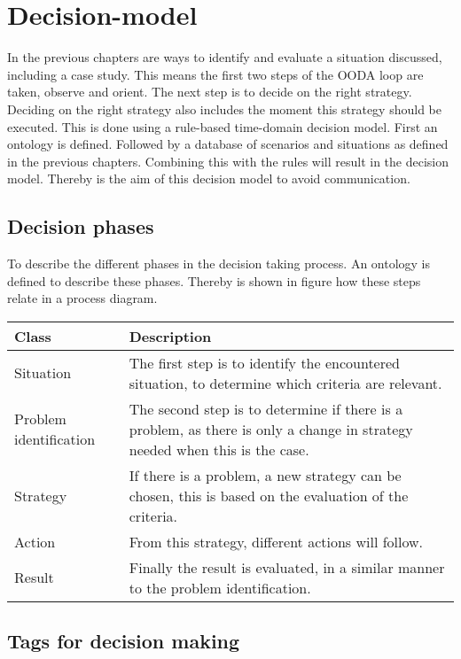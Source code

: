 \chapter{Decision-model}
In the previous chapters are ways to identify and evaluate a situation discussed, including a case study. This means the first two steps of the OODA loop are taken, observe and orient. The next step is to decide on the right strategy. Deciding on the right strategy also includes the moment this strategy should be executed. 
This is done using a rule-based time-domain decision model. First an ontology is defined. Followed by a database of scenarios and situations as defined in the previous chapters. Combining this with the rules will result in the decision model. Thereby is the aim of this decision model to avoid communication.

\section{Decision phases}
To describe the different phases in the decision taking process. An ontology is defined to describe these phases. Thereby is shown in figure  how these steps relate in a process diagram.
\begin{table}[H]
	\begin{tabular}{p{}|p{}}
		\toprule
		Class & Description\\
		\midrule
		Situation & The first step is to identify the encountered situation, to determine which criteria are relevant. \\
		Problem identification & The second step is to determine if there is a problem, as there is only a change in strategy needed when this is the case. \\
		Strategy & If there is a problem, a new strategy can be chosen, this is based on the evaluation of the criteria. \\
		Action & From this strategy, different actions will follow. \\
		Result & Finally the result is evaluated, in a similar manner to the problem identification. \\
		\bottomrule
	\end{tabular}
	
	\label{tab:ontology}
\end{table}



\section{Tags for decision making}

